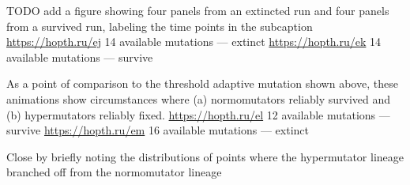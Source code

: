 TODO add a figure showing four panels from an extincted run and four panels from a survived run, labeling the time points in the subcaption
\url{https://hopth.ru/ej} 14 available mutations --- extinct
\url{https://hopth.ru/ek} 14 available mutations --- survive

As a point of comparison to the threshold adaptive mutation shown above, these animations show circumstances where (a) normomutators reliably survived and (b) hypermutators reliably fixed.
\url{https://hopth.ru/el} 12 available mutations --- survive
\url{https://hopth.ru/em} 16 available mutations --- extinct

Close by briefly noting the distributions of points where the hypermutator lineage branched off from the normomutator lineage
